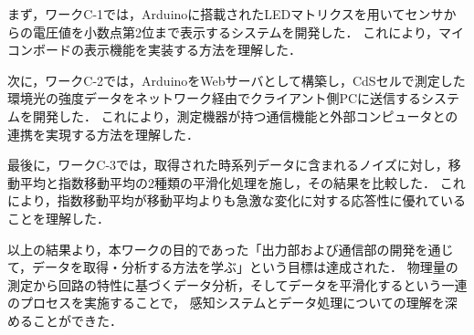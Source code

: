 まず，ワークC-1では，Arduinoに搭載されたLEDマトリクスを用いてセンサからの電圧値を小数点第2位まで表示するシステムを開発した．
これにより，マイコンボードの表示機能を実装する方法を理解した．

次に，ワークC-2では，ArduinoをWebサーバとして構築し，CdSセルで測定した環境光の強度データをネットワーク経由でクライアント側PCに送信するシステムを開発した．
これにより，測定機器が持つ通信機能と外部コンピュータとの連携を実現する方法を理解した．

最後に，ワークC-3では，取得された時系列データに含まれるノイズに対し，移動平均と指数移動平均の2種類の平滑化処理を施し，その結果を比較した．
これにより，指数移動平均が移動平均よりも急激な変化に対する応答性に優れていることを理解した．

以上の結果より，本ワークの目的であった「出力部および通信部の開発を通じて，データを取得・分析する方法を学ぶ」という目標は達成された．
物理量の測定から回路の特性に基づくデータ分析，そしてデータを平滑化するという一連のプロセスを実施することで，
感知システムとデータ処理についての理解を深めることができた．

\clearpage